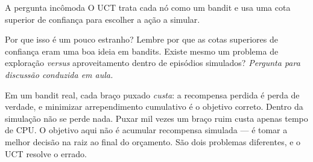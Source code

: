 \documentclass[aspectratio=169, 10pt]{beamer}
\newcommand{\paradiscussao}{\smallskip
  {\footnotesize\color{rlCinza}\itshape Pergunta para discussão conduzida em aula.}}
\begin{document}
\begin{frame}{A pergunta incômoda}
  \small
  O UCT trata cada nó como um bandit e usa uma cota superior de confiança para
  escolher a ação a simular.

  \begin{quizbox}{}
    Por que isso é um pouco estranho? Lembre por que as cotas superiores de
    confiança eram uma boa ideia em bandits. Existe mesmo um problema de
    exploração \emph{versus} aproveitamento \alert{dentro} de episódios
    simulados?
    \paradiscussao
  \end{quizbox}

  \pause
  \begin{respbox}
    Em um bandit real, cada braço puxado \emph{custa}: a recompensa perdida é
    perda de verdade, e minimizar arrependimento cumulativo é o objetivo correto.
    \smallskip
    Dentro da simulação não se perde nada. Puxar mil vezes um braço ruim custa
    apenas tempo de CPU. O objetivo aqui não é acumular recompensa simulada ---
    é \alert{tomar a melhor decisão na raiz ao final do orçamento}. São dois
    problemas diferentes, e o UCT resolve o errado.
  \end{respbox}
\end{frame}
\end{document}
